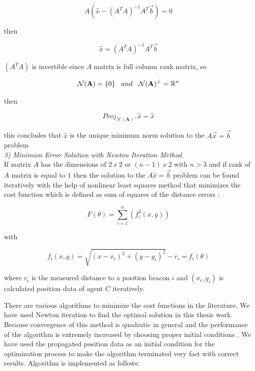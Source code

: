 \begin{equation}
 A(\hat{x} - (A^TA)^{-1}A^T\vec{b}) = 0
\end{equation}

then 

\begin{equation}
\hat{x} = (A^TA)^{-1}A^T\vec{b}
\end{equation}
  
$(A^TA)$ is invertible since $A$ matrix is full column rank matrix, so 

\begin{align}
\begin{split}
\mathcal{N}(\mathbf{A}) = \{0\} \hspace{0.3cm}  and  \hspace{0.3cm}  \mathcal{N}(\mathbf{A})^\perp =\mathbb{R} ^n 
\end{split}
\end{align}
  
then 
  
\begin{equation}
Proj_{ \mathcal{N}(\mathbf{A})^\perp}\hat{x} = \hat{x}
\end{equation}
  
this concludes that $\hat{x}$ is the unique minimum norm solution to the $A\vec{x} = \vec{b}$ problem\\
	
	
\textit{3) Minimum Error Solution with Newton Iteration Method}\\	
If matrix $A$ has the dimensions of $2\ x\ 2$ or $(n-1)\ x\ 2$ with $n>3$ and if rank of $A$ matrix is equal to $1$ then the solution to the $A\hat{x} = \vec{b}$ problem can be found iteratively with the help of nonlinear least squares method that minimizes the cost function which is defined as sum of squares of the distance errors \cite{22} :
	
\begin{equation} \label{cost_func_tri}
F(\theta) = \sum_{i=1}^{n} \left(f_i^2(x,y)\right)
\end{equation}
	
with
	
\begin{equation}
f_i(x,y) = \sqrt{(x-x_i)^2 + (y - y_i)^2} - r_i = f_i(\theta) 
\end{equation}

where $r_i$ is the measured distance to a position beacon $i$ and $(x_i, y_i)$ is calculated position data of agent $C$ iteratively.

There are various algorithms to minimize the cost functions in the literature. We have used Newton iteration to find the optimal solution in this thesis work. Because convergence of this method is quadratic in general and the performance of the algorithm is extremely increased by choosing proper initial conditions \cite{wiki_newton}. We have used the propagated position data as an initial condition for the optimization process to make the algorithm terminated very fast with correct results. Algorithm is implemented as follows:

